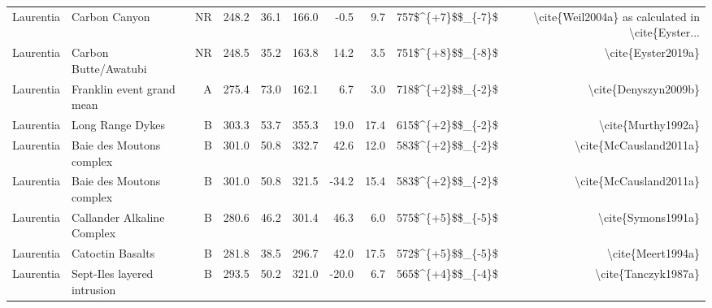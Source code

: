 \begin{longtable}{p{1 in}p{1 in}rrrrrrrr}
                     Laurentia &                                    Carbon Canyon &     NR &     248.2 &      36.1 & 166.0 &  -0.5 &       9.7 &      757\$\textasciicircum \{+7\}\$\$\_\{-7\}\$ &  \textbackslash cite\{Weil2004a\} as calculated in \textbackslash cite\{Eyster... \\
                     Laurentia &                             Carbon Butte/Awatubi &     NR &     248.5 &      35.2 & 163.8 &  14.2 &       3.5 &      751\$\textasciicircum \{+8\}\$\$\_\{-8\}\$ &                                 \textbackslash cite\{Eyster2019a\} \\
                     Laurentia &                        Franklin event grand mean &      A &     275.4 &      73.0 & 162.1 &   6.7 &       3.0 &      718\$\textasciicircum \{+2\}\$\$\_\{-2\}\$ &                               \textbackslash cite\{Denyszyn2009b\} \\
                     Laurentia &                                 Long Range Dykes &      B &     303.3 &      53.7 & 355.3 &  19.0 &      17.4 &      615\$\textasciicircum \{+2\}\$\$\_\{-2\}\$ &                                 \textbackslash cite\{Murthy1992a\} \\
                     Laurentia &                         Baie des Moutons complex &      B &     301.0 &      50.8 & 332.7 &  42.6 &      12.0 &      583\$\textasciicircum \{+2\}\$\$\_\{-2\}\$ &                             \textbackslash cite\{McCausland2011a\} \\
                     Laurentia &                         Baie des Moutons complex &      B &     301.0 &      50.8 & 321.5 & -34.2 &      15.4 &      583\$\textasciicircum \{+2\}\$\$\_\{-2\}\$ &                             \textbackslash cite\{McCausland2011a\} \\
                     Laurentia &                       Callander Alkaline Complex &      B &     280.6 &      46.2 & 301.4 &  46.3 &       6.0 &      575\$\textasciicircum \{+5\}\$\$\_\{-5\}\$ &                                 \textbackslash cite\{Symons1991a\} \\
                     Laurentia &                                 Catoctin Basalts &      B &     281.8 &      38.5 & 296.7 &  42.0 &      17.5 &      572\$\textasciicircum \{+5\}\$\$\_\{-5\}\$ &                                  \textbackslash cite\{Meert1994a\} \\
                     Laurentia &                      Sept-Iles layered intrusion &      B &     293.5 &      50.2 & 321.0 & -20.0 &       6.7 &      565\$\textasciicircum \{+4\}\$\$\_\{-4\}\$ &                                \textbackslash cite\{Tanczyk1987a\} \\
\end{longtable}
